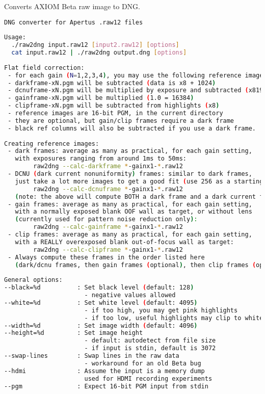 Converts AXIOM Beta raw image to DNG. 

   
\begin{lstlisting}[language=bash,morekeywords=$,keywordstyle=\bfseries,frame=none,xleftmargin=.25in,belowskip=2em, aboveskip=2em]
DNG converter for Apertus .raw12 files
 
Usage:
  ./raw2dng input.raw12 [input2.raw12] [options]
  cat input.raw12 | ./raw2dng output.dng [options]
 
Flat field correction:
 - for each gain (N=1,2,3,4), you may use the following reference images:
 - darkframe-xN.pgm will be subtracted (data is x8 + 1024)
 - dcnuframe-xN.pgm will be multiplied by exposure and subtracted (x8192 + 8192)
 - gainframe-xN.pgm will be multiplied (1.0 = 16384)
 - clipframe-xN.pgm will be subtracted from highlights (x8)
 - reference images are 16-bit PGM, in the current directory
 - they are optional, but gain/clip frames require a dark frame
 - black ref columns will also be subtracted if you use a dark frame.
 
Creating reference images:
 - dark frames: average as many as practical, for each gain setting,
   with exposures ranging from around 1ms to 50ms:
        raw2dng --calc-darkframe *-gainx1-*.raw12 
 - DCNU (dark current nonuniformity) frames: similar to dark frames,
   just take a lot more images to get a good fit (use 256 as a starting point):
        raw2dng --calc-dcnuframe *-gainx1-*.raw12 
   (note: the above will compute BOTH a dark frame and a dark current frame)
 - gain frames: average as many as practical, for each gain setting,
   with a normally exposed blank OOF wall as target, or without lens
   (currently used for pattern noise reduction only):
        raw2dng --calc-gainframe *-gainx1-*.raw12 
 - clip frames: average as many as practical, for each gain setting,
   with a REALLY overexposed blank out-of-focus wall as target:
        raw2dng --calc-clipframe *-gainx1-*.raw12 
 - Always compute these frames in the order listed here
   (dark/dcnu frames, then gain frames (optional), then clip frames (optional).
 
General options:
--black=%d          : Set black level (default: 128)
                      - negative values allowed
--white=%d          : Set white level (default: 4095)
                      - if too high, you may get pink highlights
                      - if too low, useful highlights may clip to white
--width=%d          : Set image width (default: 4096)
--height=%d         : Set image height
                      - default: autodetect from file size
                      - if input is stdin, default is 3072
--swap-lines        : Swap lines in the raw data
                      - workaround for an old Beta bug
--hdmi              : Assume the input is a memory dump
                      used for HDMI recording experiments
--pgm               : Expect 16-bit PGM input from stdin
 

\end{lstlisting}
